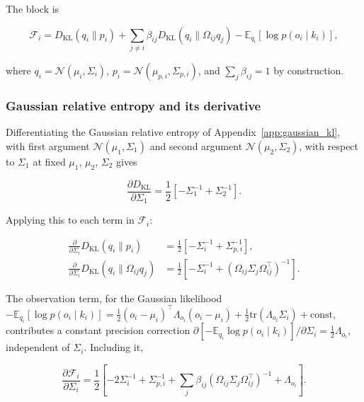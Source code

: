 \documentclass[11pt]{article}
\begin{document}
The block is

\begin{equation}
\mathcal{F}_i
=D_{\mathrm{KL}}(q_i \| p_i)
+ \sum_{j \neq i} \beta_{ij}
D_{\mathrm{KL}}(q_i \| \Omega_{ij} q_j)
- \mathbb{E}_{q_i}[\log p(o_i \mid k_i)],
\end{equation}

where $q_i = \mathcal{N}(\mu_i, \Sigma_i)$, $p_i = \mathcal{N}(\mu_{p,i}, \Sigma_{p,i})$, and $\sum_j \beta_{ij} = 1$ by construction.

\subsubsection{Gaussian relative entropy and its derivative}

Differentiating the Gaussian relative entropy of Appendix~\ref{app:gaussian_kl}, with first argument $\mathcal{N}(\mu_1,\Sigma_1)$ and second argument $\mathcal{N}(\mu_2,\Sigma_2)$, with respect to $\Sigma_1$ at fixed $\mu_1$, $\mu_2$, $\Sigma_2$ gives

\begin{equation}
\frac{\partial D_{\mathrm{KL}}}{\partial \Sigma_1}
=\frac{1}{2}\left[
-\Sigma_1^{-1}
+ \Sigma_2^{-1}
\right].
\end{equation}

Applying this to each term in $\mathcal{F}_i$:

\begin{align}
\frac{\partial}{\partial \Sigma_i}
D_{\mathrm{KL}}(q_i \| p_i)
&=\frac{1}{2}\left[
-\Sigma_i^{-1}
+ \Sigma_{p,i}^{-1}
\right],
\\[6pt]
\frac{\partial}{\partial \Sigma_i}
D_{\mathrm{KL}}(q_i \| \Omega_{ij} q_j)
&=
\frac{1}{2}\left[
-\Sigma_i^{-1}
+ (\Omega_{ij}\Sigma_j\Omega_{ij}^\top)^{-1}
\right].
\end{align}

The observation term, for the Gaussian likelihood $-\mathbb{E}_{q_i}[\log p(o_i \mid k_i)] = \tfrac{1}{2}(o_i - \mu_i)^\top \Lambda_{o_i}(o_i - \mu_i) + \tfrac{1}{2}\mathrm{tr}(\Lambda_{o_i}\Sigma_i) + \mathrm{const}$, contributes a constant precision correction $\partial[-\mathbb{E}_{q_i}\log p(o_i \mid k_i)]/\partial\Sigma_i = \tfrac{1}{2}\Lambda_{o_i}$, independent of $\Sigma_i$. Including it,

\begin{equation}
\boxed{
\frac{\partial \mathcal{F}_i}{\partial \Sigma_i}
=\frac{1}{2}
\left[
-2 \Sigma_i^{-1}
+ \Sigma_{p,i}^{-1}
+ \sum_j \beta_{ij}
(\Omega_{ij}\Sigma_j\Omega_{ij}^\top)^{-1}
+ \Lambda_{o_i}
\right].
}
\end{equation}
\end{document}
